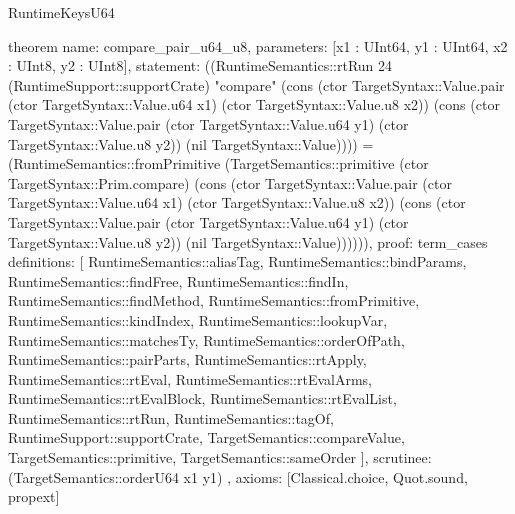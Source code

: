 \begin{lexlean}{RuntimeKeysU64}
\begin{semanticmodule}
theorem{
  name: compare_pair_u64_u8,
  parameters: [x1 : UInt64, y1 : UInt64, x2 : UInt8, y2 : UInt8],
  statement: ((RuntimeSemantics::rtRun 24 (RuntimeSupport::supportCrate) "compare" (cons (ctor TargetSyntax::Value.pair (ctor TargetSyntax::Value.u64 x1) (ctor TargetSyntax::Value.u8 x2)) (cons (ctor TargetSyntax::Value.pair (ctor TargetSyntax::Value.u64 y1) (ctor TargetSyntax::Value.u8 y2)) (nil TargetSyntax::Value)))) = (RuntimeSemantics::fromPrimitive (TargetSemantics::primitive (ctor TargetSyntax::Prim.compare) (cons (ctor TargetSyntax::Value.pair (ctor TargetSyntax::Value.u64 x1) (ctor TargetSyntax::Value.u8 x2)) (cons (ctor TargetSyntax::Value.pair (ctor TargetSyntax::Value.u64 y1) (ctor TargetSyntax::Value.u8 y2)) (nil TargetSyntax::Value)))))),
  proof: term_cases{
    definitions: [
      RuntimeSemantics::aliasTag,
      RuntimeSemantics::bindParams,
      RuntimeSemantics::findFree,
      RuntimeSemantics::findIn,
      RuntimeSemantics::findMethod,
      RuntimeSemantics::fromPrimitive,
      RuntimeSemantics::kindIndex,
      RuntimeSemantics::lookupVar,
      RuntimeSemantics::matchesTy,
      RuntimeSemantics::orderOfPath,
      RuntimeSemantics::pairParts,
      RuntimeSemantics::rtApply,
      RuntimeSemantics::rtEval,
      RuntimeSemantics::rtEvalArms,
      RuntimeSemantics::rtEvalBlock,
      RuntimeSemantics::rtEvalList,
      RuntimeSemantics::rtRun,
      RuntimeSemantics::tagOf,
      RuntimeSupport::supportCrate,
      TargetSemantics::compareValue,
      TargetSemantics::primitive,
      TargetSemantics::sameOrder
    ],
    scrutinee: (TargetSemantics::orderU64 x1 y1)
  },
  axioms: [Classical.choice, Quot.sound, propext]
}


\end{semanticmodule}
\end{lexlean}
